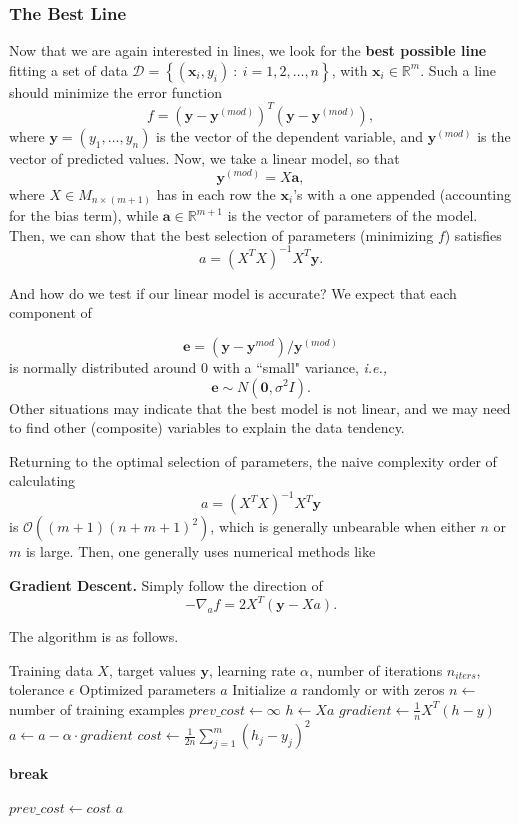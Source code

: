 \documentclass[xcolor=svgnames, t]{beamer}
\theoremstyle{definition}
\theoremstyle{plain}
\theoremstyle{remark}
\begin{document}
\begin{frame}[allowframebreaks]
	\frametitle{The Best Line}
	Now that we are again interested in lines, we look for the \textbf{best possible line} fitting a set of data $ \mathcal{D}= \left\{ (\boldsymbol{x}_i,y_i ) \ : \ i=1,2,\dots,n \right\}  $, with $ \boldsymbol{x}_i\in\mathbb{R}^m  $. Such a line should minimize the error function
	$$ f = ( \boldsymbol{y} - \boldsymbol{y}^{(mod)}  )^T( \boldsymbol{y} - \boldsymbol{y}^{(mod)}  ), $$ where $ \boldsymbol{y} = (y_1,\dots,y_n) $ is the vector of the dependent variable, and $ \boldsymbol{y}^{(mod)} $  is the vector of predicted values. Now, we take a linear model, so that 
	$$ \boldsymbol{y}^{(mod)} = X \boldsymbol{a},  $$ 
	where $ X \in M_{n\times(m+1)} $ has in each row the $ \boldsymbol{x}_i $'s with a one appended (accounting for the bias term), while $ \boldsymbol{a}\in \mathbb{R}^{m+1}  $  is the vector of parameters of the model.
\newpage
	Then, we can show that the best selection of parameters (minimizing $ f $) satisfies
	$$ a= \left( X^TX \right)^{-1}X^T \boldsymbol{y}.$$ 

	And how do we test if our linear model is accurate? We expect that each component of 

	$$ \boldsymbol{e} = \left( \boldsymbol{y} - \boldsymbol{y}^{mod} \right)/ \boldsymbol{y}^{(mod)}    $$ 
	is normally distributed around $ 0 $ with a ``small" variance, \textit{i.e.,} $$ \boldsymbol{e}\sim N(\boldsymbol{0}, \sigma^2 I ).$$ Other situations may indicate that the best model is not linear, and we may need to find other (composite) variables to explain the data tendency.

	Returning to the optimal selection of parameters, the naive complexity order of calculating
	$$ a= \left( X^TX \right)^{-1}X^T \boldsymbol{y}$$ 
	is $ \mathcal{O} \left( (m+1)(n+m+1)^2 \right)  $, which is generally unbearable when either $ n $ or $ m $ is large. Then, one generally uses numerical methods like

	\textbf{Gradient Descent.} Simply follow the direction of $$ -\nabla_a f=2X^T \left( \boldsymbol{y} -Xa \right). $$ 

	The algorithm is as follows.
	\begin{algorithmic}[1]
		\Require Training data $X$, target values $\boldsymbol{y} $, learning rate $\alpha$, number of iterations $n_{iters}$, tolerance $\epsilon$
\Ensure Optimized parameters $a$
\State Initialize $a$ randomly or with zeros
\State $n \gets $ number of training examples
\State $prev\_cost \gets \infty$
\State $h \gets Xa$ 
\State $gradient \gets \frac{1}{n} X^T (h - y)$ 
\State $a \gets a - \alpha \cdot gradient$ 
\State $cost \gets \frac{1}{2n} \sum_{j=1}^m (h_j - y_j)^2$ 

    \State \textbf{break} 
\EndIf

\State $prev\_cost \gets cost$
\EndFor
\State\Return $a$
\end{algorithmic}
\end{frame}
\end{document}

